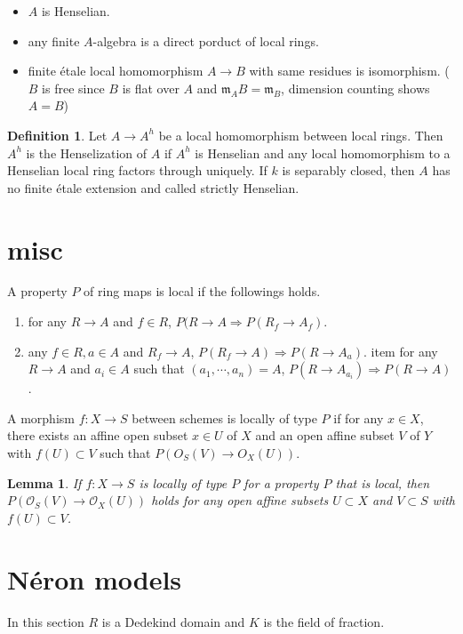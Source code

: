 \documentclass[leqno]{amsart}
\newcommand{\oo}{\mathcal O}
\newcommand{\1}{\mathbf{1}}
\newcommand{\fm}{\mathfrak m}
\newtheorem{lem}[thm]{Lemma}
\theoremstyle{definition}
\newtheorem{defn}[thm]{Definition}
\theoremstyle{remark}
\begin{document}
\begin{itemize}
	\item $A$ is Henselian.
	\item any finite  $A$-algebra 
		is a direct porduct of local rings.
	\item finite  \'{e}tale local homomorphism
		$A\to B$ with same residues 
		is isomorphism.
		($B$ is free since  $B$ is flat over  $A$
		and  $\fm_AB=\fm_B$, dimension counting
		shows  $A=B$)
\end{itemize}


\begin{defn}
	Let $A\to A^h$
	be a local homomorphism between local rings.
	Then $A^h$ is the Henselization of  $A$
	if  $A^h$ is Henselian and 
	any local homomorphism to a Henselian local ring
	factors through uniquely.
	If  $k$ is separably closed,
	then  $A$ has no finite  \'{e}tale extension 
	and called strictly Henselian.
\end{defn}



\section{misc}

A property $P$ of ring maps is local if 
the followings holds.
\begin{enumerate}[label=(\alph*)]
	 \item for  any $R\to A$ and  $f\in R$,
	 $P(R\to A \Longrightarrow P(R_f\to A_f)$.
	 \item    any  $f\in R, a\in A$ and  $R_f\to A$,
	 $P(R_f\to A)\Longrightarrow P(R\to A_a)$.
	 item for any  $R\to A$ and  $a_i\in A$ 
	 such that  $(a_1,\cdots,a_n)=A$,
		$P(R\to A_{a_i})\Longrightarrow P(R\to A)$.
\end{enumerate}
A morphism $f\colon X\to S$ between schemes 
is locally of type $P$ if for any  $x\in X$,
there exists an affine open subset  $x\in U$ of  $X$
and an open affine subset $V$ of $Y$ with  $f(U)\subset V$
such that $P(O_S(V)\to O_X(U))$.
\begin{lem}
	If $f\colon X\to S$ is locally of type  $P$
	for a property  $P$ that is local,
	then $P(\oo_S(V)\to \oo_X(U))$ holds
	for any open affine subsets 
	$U\subset X$ and  $V\subset S$
	with  $f(U)\subset V$.
\end{lem}


\section{N\'{e}ron models}
In this section $R$ is a Dedekind domain 
and  $K$ is the field of fraction.
\end{document}
